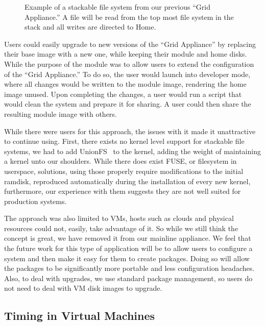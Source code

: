 \documentclass[conference]{IEEEtran}
\begin{document}
\begin{figure}[ht]
\centering
{}
\caption{Example of a stackable file system from our previous ``Grid
Appliance.''  A file will be read from the top most file system in the stack
and all writes are directed to Home.}
\label{fig:stackfs}
\end{figure}

Users could easily upgrade to new versions of the ``Grid Appliance'' by
replacing their base image with a new one, while keeping their module and home
disks.  While the purpose of the module was to allow users to extend the
configuration of the ``Grid Appliance.''  To do so, the user would launch into
developer mode, where all changes would be written to the module image,
rendering the home image unused.  Upon completing the changes, a user would run
a script that would clean the system and prepare it for sharing.  A user could
then share the resulting module image with others.

While there were users for this approach, the issues with it made it
unattractive to continue using.  First, there exists no kernel level support
for stackable file systems, we had to add UnionFS~\cite{unionfs} to the kernel,
adding the weight of maintaining a kernel unto our shoulders.  While there does
exist FUSE, or filesystem in userspace, solutions, using those properly require
modifications to the initial ramdisk, reproduced automatically during the
installation of every new kernel, furthermore, our experience with them
suggests they are not well suited for production systems.

The approach was also limited to VMs, hosts such as clouds and physical
resources could not, easily, take advantage of it.  So while we still think the
concept is great, we have removed it from our mainline appliance.  We feel that
the future work for this type of application will be to allow users to
configure a system and then make it easy for them to create packages.  Doing so
will allow the packages to be significantly more portable and less
configuration headaches.  Also, to deal with upgrades, we use standard package
management, so users do not need to deal with VM disk images to upgrade.

\subsection{Timing in Virtual Machines}

\end{document}
